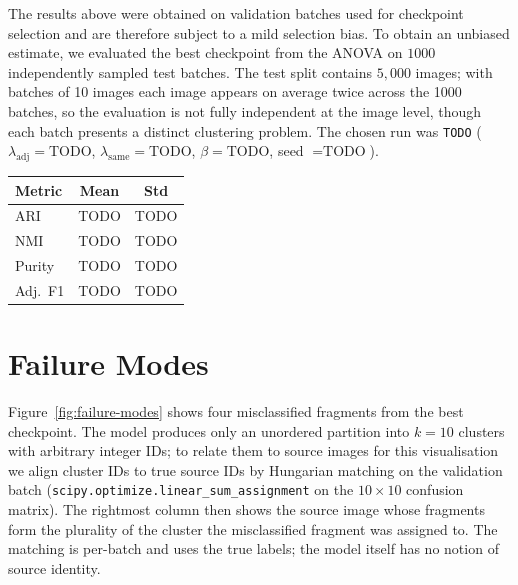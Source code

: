 \documentclass[12pt, a4paper]{article}
\begin{document}

The results above were obtained on validation batches used for checkpoint
selection and are therefore subject to a mild selection bias. To obtain an
unbiased estimate, we evaluated the best checkpoint from the ANOVA on
$1000$ independently sampled test batches. The test split contains $5{,}000$
images; with batches of 10 images each image appears on average twice across
the 1000 batches, so the evaluation is not fully independent at the image
level, though each batch presents a distinct clustering problem. The chosen
run was \texttt{TODO} ($\lambda_{\text{adj}} = \text{TODO}$,
$\lambda_{\text{same}} = \text{TODO}$, $\beta = \text{TODO}$,
seed $= \text{TODO}$).

\begin{center}
\begin{tabular}{lcc}
\toprule
\textbf{Metric} & \textbf{Mean} & \textbf{Std} \\
\midrule
ARI     & TODO & TODO \\
NMI     & TODO & TODO \\
Purity  & TODO & TODO \\
Adj.\ F1 & TODO & TODO \\
\bottomrule
\end{tabular}
\end{center}

\section{Failure Modes}

Figure~\ref{fig:failure-modes} shows four misclassified fragments from the
best checkpoint. The model produces only an unordered partition into $k = 10$
clusters with arbitrary integer IDs; to relate them to source images for
this visualisation we align cluster IDs to true source IDs by Hungarian
matching on the validation batch
(\texttt{scipy.optimize.linear\_sum\_assignment} on the $10 \times 10$
confusion matrix). The rightmost column then shows the source image whose
fragments form the plurality of the cluster the misclassified fragment was
assigned to. The matching is per-batch and uses the true labels; the model
itself has no notion of source identity.
\end{document}
